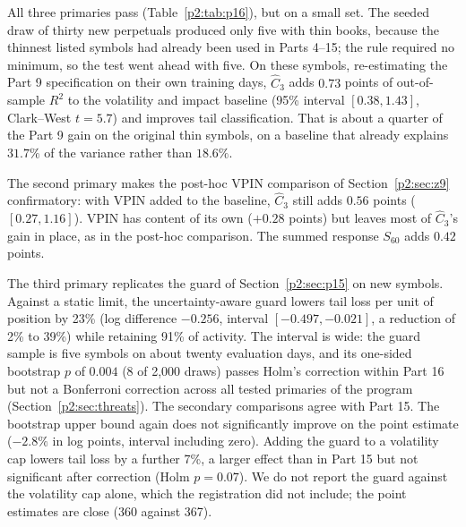 All three primaries pass (Table~\ref{p2:tab:p16}), but on a small set. The seeded draw of thirty new perpetuals produced only five with thin books, because the thinnest listed symbols had already been used in Parts 4--15; the rule required no minimum, so the test went ahead with five. On these symbols, re-estimating the Part 9 specification on their own training days, $\hat C_3$ adds $0.73$ points of out-of-sample $R^2$ to the volatility and impact baseline (95\% interval $[0.38,1.43]$, Clark--West $t=5.7$) and improves tail classification. That is about a quarter of the Part 9 gain on the original thin symbols, on a baseline that already explains $31.7\%$ of the variance rather than $18.6\%$.

The second primary makes the post-hoc VPIN comparison of Section~\ref{p2:sec:z9} confirmatory: with VPIN added to the baseline, $\hat C_3$ still adds $0.56$ points ($[0.27,1.16]$). VPIN has content of its own ($+0.28$ points) but leaves most of $\hat C_3$'s gain in place, as in the post-hoc comparison. The summed response $S_{60}$ adds $0.42$ points.

The third primary replicates the guard of Section~\ref{p2:sec:p15} on new symbols. Against a static limit, the uncertainty-aware guard lowers tail loss per unit of position by 23\% (log difference $-0.256$, interval $[-0.497,-0.021]$, a reduction of 2\% to 39\%) while retaining 91\% of activity. The interval is wide: the guard sample is five symbols on about twenty evaluation days, and its one-sided bootstrap $p$ of $0.004$ (8 of 2{,}000 draws) passes Holm's correction within Part 16 but not a Bonferroni correction across all tested primaries of the program (Section~\ref{p2:sec:threats}). The secondary comparisons agree with Part 15. The bootstrap upper bound again does not significantly improve on the point estimate ($-2.8\%$ in log points, interval including zero). Adding the guard to a volatility cap lowers tail loss by a further 7\%, a larger effect than in Part 15 but not significant after correction (Holm $p=0.07$). We do not report the guard against the volatility cap alone, which the registration did not include; the point estimates are close (360 against 367).

